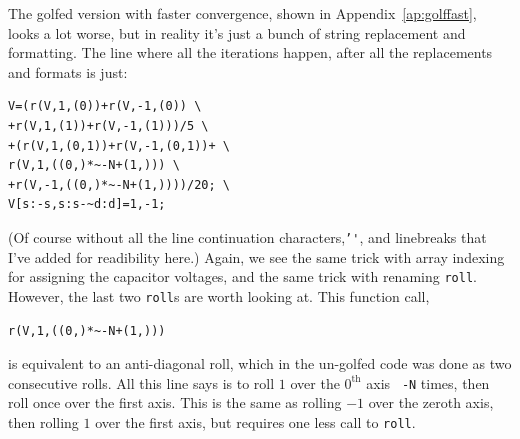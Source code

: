\documentclass[12pt,twocolumn]{article}
\begin{document}
The golfed version with faster convergence, shown in Appendix~\ref{ap:golffast}, looks a lot worse, but in reality it's just a bunch of string replacement and formatting. The line where all the iterations happen, after all the replacements and formats is just:
\begin{verbatim}
V=(r(V,1,(0))+r(V,-1,(0)) \
+r(V,1,(1))+r(V,-1,(1)))/5 \
+(r(V,1,(0,1))+r(V,-1,(0,1))+ \
r(V,1,((0,)*~-N+(1,))) \
+r(V,-1,((0,)*~-N+(1,))))/20; \
V[s:-s,s:s-~d:d]=1,-1;
\end{verbatim}
(Of course without all the line continuation characters,\texttt{'\'}, and linebreaks that I've added for readibility here.) Again, we see the same trick with array indexing for assigning the capacitor voltages, and the same trick with renaming \texttt{roll}. However, the last two \texttt{roll}s are worth looking at. This function call,
\begin{verbatim}
r(V,1,((0,)*~-N+(1,)))
\end{verbatim}
is equivalent to an anti-diagonal roll, which in the un-golfed code was done as two consecutive rolls. All this line says is to roll $1$ over the $0^\mathrm{th}$ axis \texttt{~-N} times, then roll once over the first axis. This is the same as rolling $-1$ over the zeroth axis, then rolling $1$ over the first axis, but requires one less call to \texttt{roll}.
\end{document}
